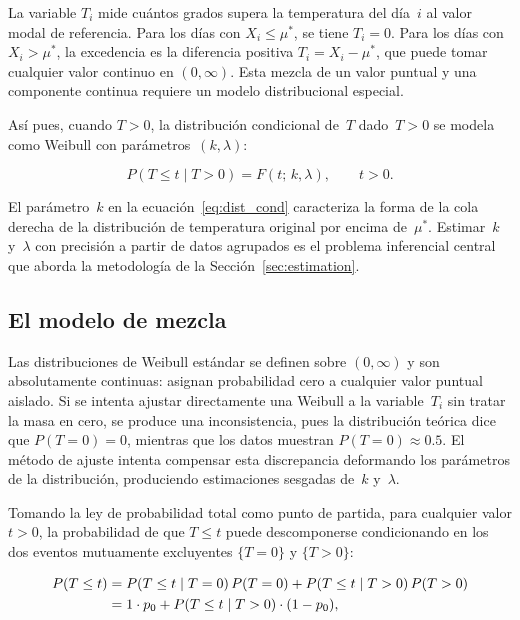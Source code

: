 \documentclass[APA,STIX1COL]{WileyNJD-v2}
\begin{document}
{La variable $T_i$ mide cu\'antos grados supera la temperatura del
d\'ia~$i$ al valor modal de referencia. Para los d\'ias con
$X_i\leq\mu^*$, se tiene $T_i=0$. Para los d\'ias con
$X_i>\mu^*$, la excedencia es la diferencia positiva
$T_i=X_i-\mu^*$, que puede tomar cualquier valor continuo en
$(0,\infty)$. Esta mezcla de un valor puntual y una componente
continua requiere un modelo distribucional especial.

Así pues, cuando $T>0$, la
distribuci\'on condicional de~$T$ dado~$T>0$ se modela como Weibull
con par\'ametros~$(k,\lambda)$:

\begin{equation}\label{eq:dist_cond}
P(T\leq t \mid T>0) = F(t;\,k,\lambda),\qquad t>0.
\end{equation}

El par\'ametro~$k$ en la ecuaci\'on~\eqref{eq:dist_cond} caracteriza
la forma de la cola derecha de la distribuci\'on de temperatura
original por encima de~$\mu^*$. Estimar~$k$ y~$\lambda$ con
precisi\'on a partir de datos agrupados es el problema inferencial
central que aborda la metodolog\'ia de la
Secci\'on~\ref{sec:estimation}.


\subsection{El modelo de mezcla}

Las distribuciones de Weibull est\'andar se definen sobre
$(0,\infty)$ y son absolutamente continuas: asignan probabilidad
cero a cualquier valor puntual aislado. Si se intenta ajustar
directamente una Weibull a la variable~$T_i$ sin tratar la masa
en cero, se produce una inconsistencia, pues la distribuci\'on
te\'orica dice que $P(T=0)=0$, mientras que los datos muestran
$P(T=0)\approx 0.5$. El m\'etodo de ajuste intenta compensar esta discrepancia deformando los par\'ametros de la distribuci\'on,
produciendo estimaciones sesgadas de~$k$ y~$\lambda$.

Tomando la ley de probabilidad total como punto de partida, para cualquier valor $t>0$, la probabilidad de que $T\leq t$
puede descomponerse condicionando en los dos eventos mutuamente
excluyentes $\{T=0\}$ y $\{T>0\}$:

\begin{align}
P(T\leq t)
  &= P(T\leq t\mid T=0)\,P(T=0)
   + P(T\leq t\mid T>0)\,P(T>0) \notag \\
  &= 1\cdot p_0 + P(T\leq t\mid T>0)\cdot (1-p_0),
    \label{eq:pt_total}
\end{align}

}
\end{document}

